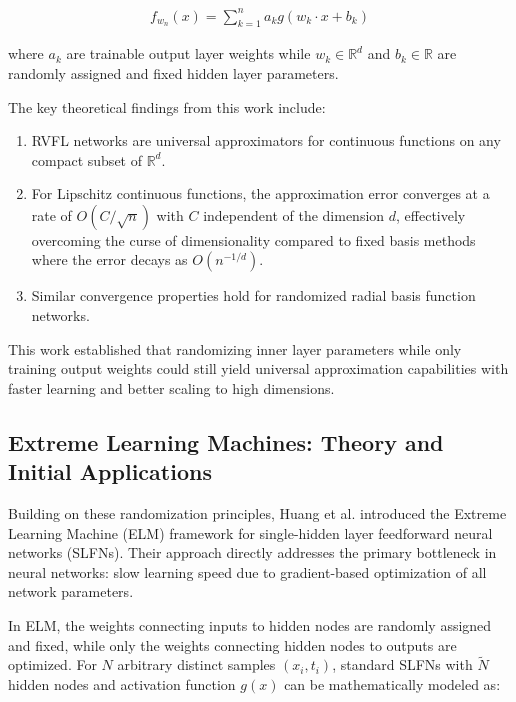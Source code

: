 \documentclass[11pt]{article}
\begin{document}
\begin{align}
f_{w_n}(x) = \sum_{k=1}^n a_k g(w_k \cdot x + b_k)
\end{align}

where $a_k$ are trainable output layer weights while $w_k \in \mathbb{R}^d$ and $b_k \in \mathbb{R}$ are randomly assigned and fixed hidden layer parameters.

The key theoretical findings from this work include:

\begin{enumerate}
    \item RVFL networks are universal approximators for continuous functions on any compact subset of $\mathbb{R}^d$.
    
    \item For Lipschitz continuous functions, the approximation error converges at a rate of $O(C/\sqrt{n})$ with $C$ independent of the dimension $d$, effectively overcoming the curse of dimensionality compared to fixed basis methods where the error decays as $O(n^{-1/d})$.
    
    \item Similar convergence properties hold for randomized radial basis function networks.
\end{enumerate}

This work established that randomizing inner layer parameters while only training output weights could still yield universal approximation capabilities with faster learning and better scaling to high dimensions.

\subsection{Extreme Learning Machines: Theory and Initial Applications}

Building on these randomization principles, Huang et al. \citep{Huang2006} introduced the Extreme Learning Machine (ELM) framework for single-hidden layer feedforward neural networks (SLFNs). Their approach directly addresses the primary bottleneck in neural networks: slow learning speed due to gradient-based optimization of all network parameters.

In ELM, the weights connecting inputs to hidden nodes are randomly assigned and fixed, while only the weights connecting hidden nodes to outputs are optimized. For $N$ arbitrary distinct samples $(x_i, t_i)$, standard SLFNs with $\tilde{N}$ hidden nodes and activation function $g(x)$ can be mathematically modeled as:
\end{document}
